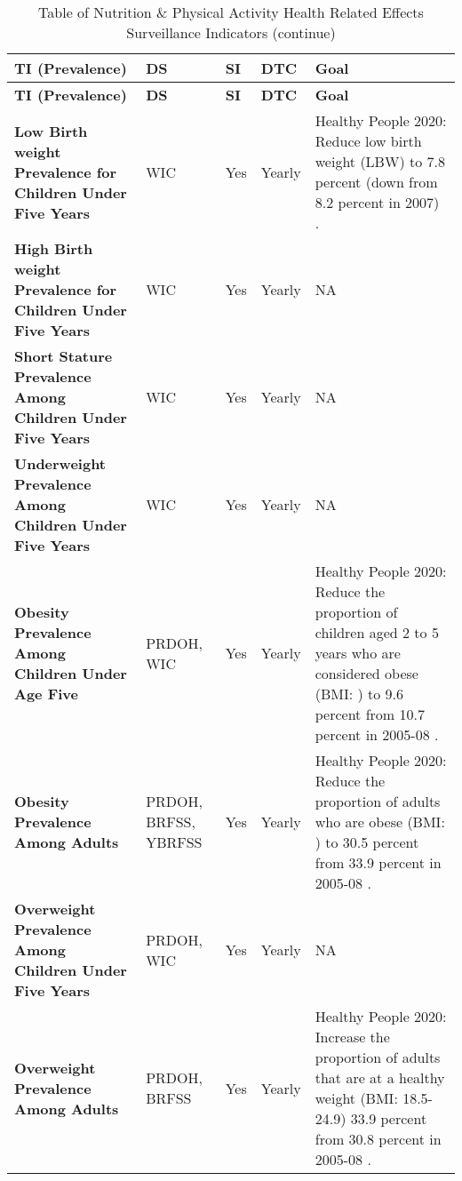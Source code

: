 \documentclass[12pt,letterpaper]{report}
\begin{document}
\newpage
\begin{landscape}
\begin{longtable}{|
>{\raggedright\arraybackslash}p{}|
>{\raggedright\arraybackslash}p{}|
>{\raggedright\arraybackslash}p{}|
>{\raggedright\arraybackslash}p{}|
>{\raggedright\arraybackslash}p{}|}
\caption{Table of Nutrition \& Physical Activity Health Related Effects Surveillance Indicators}
\hline
\textbf{TI (Prevalence)} & \textbf{DS} & \textbf{SI} & \textbf{DTC} & \textbf{Goal} \\ 
\hline
\endfirsthead
\caption[]{Table of Nutrition \& Physical Activity Health Related Effects Surveillance Indicators (continue)}
\hline
\textbf{TI (Prevalence)} & \textbf{DS} & \textbf{SI} & \textbf{DTC} & \textbf{Goal} \\ 
\hline 
\endhead %
\textbf{Low Birth weight Prevalence for Children Under Five Years} 
& WIC
& Yes
& Yearly
& Healthy People 2020: Reduce low birth weight (LBW) to 7.8 percent (down from 8.2 percent in 2007) \cite{Healthymaternal}. \\ 
\hline
\textbf{High Birth weight Prevalence for Children Under Five Years} 
& WIC
& Yes
& Yearly
& NA \\ 
\hline
\textbf{Short Stature Prevalence Among Children Under Five Years} 
& WIC
& Yes
& Yearly
& NA \\ 
\hline
\textbf{Underweight Prevalence Among Children Under Five Years} 
& WIC
& Yes
& Yearly
& NA \\ 
\hline
\textbf{Obesity Prevalence Among Children Under Age Five} 
& PRDOH, WIC
& Yes 
& Yearly 
& Healthy People 2020: Reduce the proportion of children aged 2 to 5 years who are considered obese (BMI: ) to 9.6 percent from 10.7 percent in 2005-08 \cite{Healthynutritionweight}. \\ 
\hline
\textbf{Obesity Prevalence Among Adults} 
& PRDOH, BRFSS, YBRFSS
& Yes 
& Yearly 
& Healthy People 2020: Reduce the proportion of adults who are obese (BMI: ) to 30.5 percent from 33.9 percent in 2005-08 \cite{Healthynutritionweight}. \\ 
\hline
\textbf{Overweight Prevalence Among Children Under Five Years} 
& PRDOH, WIC
& Yes
& Yearly 
& NA \\ 
\hline
\textbf{Overweight Prevalence Among Adults} 
& PRDOH, BRFSS
& Yes
& Yearly 
& Healthy People 2020: Increase the proportion of adults that are at a healthy weight (BMI: 18.5-24.9) 33.9 percent from 30.8 percent in 2005-08 \cite{Healthynutritionweight}.\\ 

\end{longtable}
\end{landscape}
\end{document}
